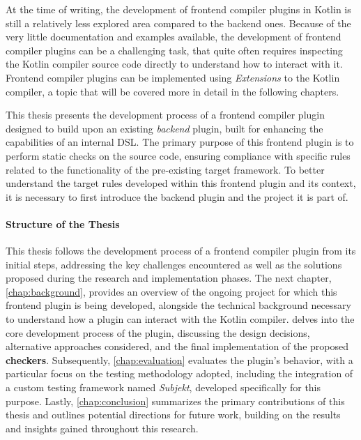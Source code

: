 \documentclass[12pt,a4paper,openright,twoside]{book}
\begin{document}
At the time of writing, the development of frontend compiler plugins in Kotlin
is still a relatively less explored area compared to the backend ones. Because
of the very little documentation and examples available, the development of
frontend compiler plugins can be a challenging task, that quite often requires
inspecting the Kotlin compiler source code directly to understand how to
interact with it.
%
Frontend compiler plugins can be implemented using \textit{Extensions} to the
Kotlin compiler, a topic that will be covered more in detail in the following
chapters. 

This thesis presents the development process of a frontend compiler plugin
designed to build upon an existing \textit{backend} plugin, built for enhancing
the capabilities of an internal \ac{DSL}. The primary purpose of this frontend
plugin is to perform static checks on the source code, ensuring compliance with
specific rules related to the functionality of the pre-existing target
framework. To better understand the target rules developed within this frontend
plugin and its context, it is necessary to first introduce the backend plugin
and the project it is part of.

\paragraph{Structure of the Thesis}

This thesis follows the development process of a frontend compiler plugin from
its initial steps, addressing the key challenges encountered as well as the
solutions proposed during the research and implementation phases. The next
chapter, \cref{chap:background}, provides an overview of the ongoing project for
which this frontend plugin is being developed, alongside the technical
background necessary to understand how a plugin can interact with the Kotlin
compiler.
%
 delves into the core development process of the plugin,
discussing the design decisions, alternative approaches considered, and the
final implementation of the proposed \textbf{checkers}. Subsequently,
\cref{chap:evaluation} evaluates the plugin’s behavior, with a particular focus
on the testing methodology adopted, including the integration of a custom
testing framework named \emph{Subjekt}, developed specifically for this purpose.
%
Lastly, \cref{chap:conclusion} summarizes the primary contributions of this
thesis and outlines potential directions for future work, building on the
results and insights gained throughout this research.
\end{document}

